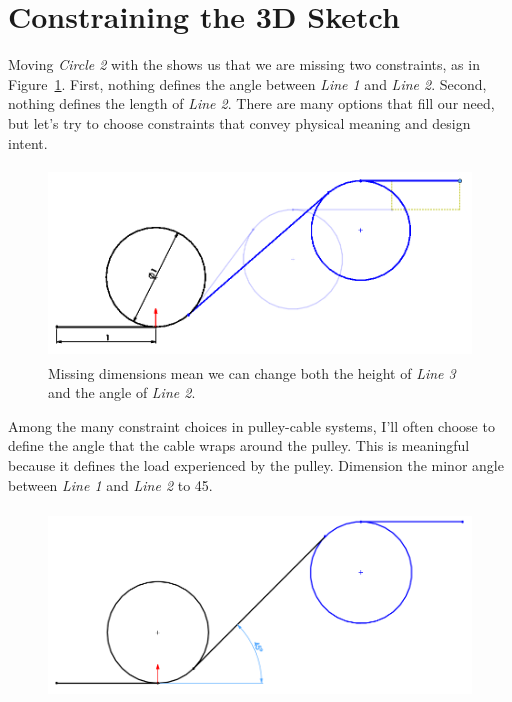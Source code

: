 \section{Constraining the 3D Sketch}

Moving \emph{Circle 2} with the  shows us that we are missing two
constraints, as in Figure~\ref{fig:unconstrained-entities}.
First, nothing defines the angle between \emph{Line 1} and \emph{Line 2}. Second, nothing
defines the length of \emph{Line 2}. There are many options that fill our need, but
let's try to choose constraints that convey physical meaning and design intent.


\begin{figure}[H]
\begin{center}
  \includegraphics[height=2in]{images/figures/unconstrained-entities.png}
\end{center}
\caption{Missing dimensions mean we can change both the height of \emph{Line 3}
  and the angle of \emph{Line 2}.
\label{fig:unconstrained-entities}}
\end{figure}

Among the many constraint choices in pulley-cable systems, I'll often choose to
define the angle that the cable wraps around the pulley. This is meaningful
because it defines the load experienced by the pulley. Dimension the minor angle between \emph{Line 1}
and \emph{Line 2} to 45\textdegree.

\begin{figure}[H]
\begin{center}
  \includegraphics[height=2in]{images/figures/cable-wrap-dimension.png}
\end{center}
\end{figure}

